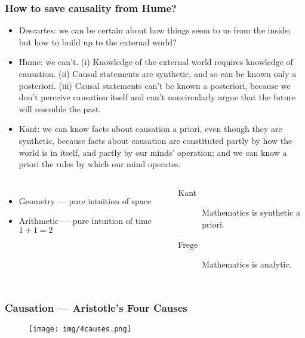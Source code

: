 \documentclass[UTF8,11pt,colorlinks,compress,openany]{beamer}%
\begin{document}
\begin{frame}\frametitle{How to save causality from Hume?}
\begin{itemize}
	\item Descartes: we can be certain about how things seem to us from the inside; but how to build up to the external world?
	\item Hume: we can't. (i) Knowledge of the external world requires knowledge of causation. (ii) Causal statements are synthetic, and so can be known only a posteriori. (iii) Causal statements can't be known a posteriori, because we don't perceive causation itself and can't noncircularly argue that the future will resemble the past.
	\item Kant: we can know facts about causation a priori, even though they are synthetic, because facts about causation are constituted partly by how the world is in itself, and partly by our minds' operation; and we can know a priori the rules by which our mind operates.
\end{itemize}
\begin{columns}
\begin{itemize}
	\item Geometry --- pure intuition of space
	\item Arithmetic --- pure intuition of time $1+1=2$
\end{itemize}
\begin{description}
	\item[Kant] Mathematics is synthetic a priori.
	\item[Frege] Mathematics is analytic.
\end{description}
\end{columns}
\end{frame}

\begin{frame}\frametitle{Causation --- Aristotle's Four Causes}
\begin{figure}[H]
\texttt{[image: img/4causes.png]}
\end{figure}
\end{frame}
\end{document}
